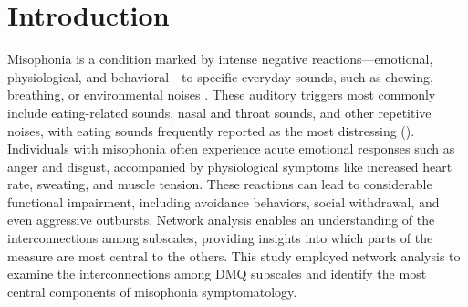 \section{Introduction}

Misophonia is a condition marked by intense negative reactions—emotional, physiological, and behavioral—to specific everyday sounds, such as chewing, breathing, or environmental noises \citep{Jastreboff2001} . These auditory triggers most commonly include eating-related sounds, nasal and throat sounds, and other repetitive noises, with eating sounds frequently reported as the most distressing (\citep{Vitoratou2021a}). Individuals with misophonia often experience acute emotional responses such as anger and disgust, accompanied by physiological symptoms like increased heart rate, sweating, and muscle tension. These reactions can lead to considerable functional impairment, including avoidance behaviors, social withdrawal, and even aggressive outbursts.
Network analysis enables an understanding of the interconnections among subscales, providing insights into which parts of the measure are most central to the others. This study employed network analysis to examine the interconnections among DMQ subscales and identify the most central components of misophonia symptomatology.
